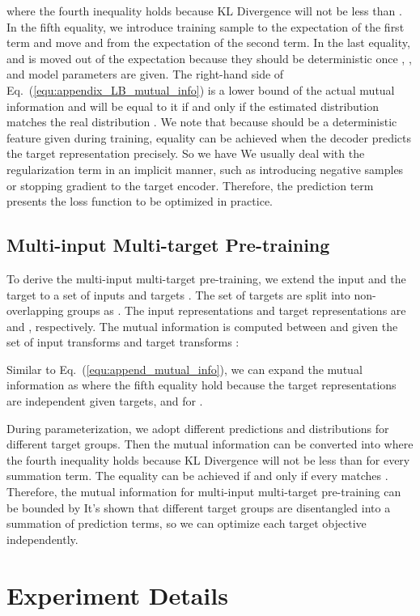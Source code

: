 \documentclass[10pt,twocolumn,letterpaper]{article}
\newcommand\smallalign[1]{\begingroup\small
    \setlength{\abovedisplayskip}{0.7em}
    \setlength{\belowdisplayskip}{0.7em}
    \setlength{\abovedisplayshortskip}{0.7em}
    \setlength{\belowdisplayshortskip}{0.7em}
    {#1}\endgroup}
\begin{document}
where the fourth inequality holds because KL Divergence will not be less than . In the fifth equality, we introduce training sample  to the expectation of the first term and move  and  from the expectation of the second term. In the last equality,  and  is moved out of the expectation because they should be deterministic once , ,  and model parameters are given. The right-hand side of Eq.~(\ref{equ:appendix_LB_mutual_info}) is a lower bound of the actual mutual information and will be equal to it if and only if the estimated distribution  matches the real distribution . We note that because  should be a deterministic feature given  during training, equality can be achieved when the decoder predicts the target representation precisely. So we have
\smallalign{}We usually deal with the regularization term in an implicit manner, such as introducing negative samples or stopping gradient to the target encoder. Therefore, the prediction term presents the loss function to be optimized in practice.


\subsection{Multi-input Multi-target Pre-training}
To derive the multi-input multi-target pre-training, we extend the input and the target to a set of  inputs  and  targets . The set of targets are split into  non-overlapping groups as . The input representations and target representations are  and , respectively. The mutual information is computed between  and  given the set of input transforms  and target transforms :

Similar to Eq.~(\ref{equ:append_mutual_info}), we can expand the mutual information as
\allowdisplaybreaks{
}where the fifth equality hold because the target representations are independent given targets, and  for .

During parameterization, we adopt different predictions  and distributions  for different target groups. Then the mutual information can be converted into
\allowdisplaybreaks{
}where the fourth inequality holds because KL Divergence will not be less than  for every summation term. The equality can be achieved if and only if every  matches .
Therefore, the mutual information for multi-input multi-target pre-training can be bounded by
\smallalign{}It's shown that different target groups are disentangled into a summation of prediction terms, so we can optimize each target objective independently.

\section{Experiment Details}
\end{document}
